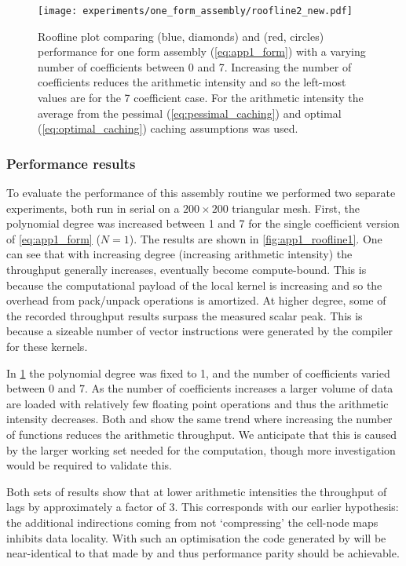 \documentclass[thesis]{subfiles}
\begin{document}
\begin{figure}
  \centering
  \texttt{[image: experiments/one\_form\_assembly/roofline2\_new.pdf]}
  \caption{
    Roofline plot comparing  (blue, diamonds) and  (red, circles) performance for one form assembly (\cref{eq:app1_form}) with a varying number of coefficients between 0 and 7.
    Increasing the number of coefficients reduces the arithmetic intensity and so the left-most values are for the 7 coefficient case.
    For the arithmetic intensity the average from the pessimal (\cref{eq:pessimal_caching}) and optimal (\cref{eq:optimal_caching}) caching assumptions was used.
  }
  \label{fig:app1_roofline2}
\end{figure}

\subsubsection{Performance results}

To evaluate the performance of this assembly routine we performed two separate experiments, both run in serial on a $200\times 200$ triangular mesh.
First, the polynomial degree was increased between 1 and 7 for the single coefficient version of \cref{eq:app1_form} ($N=1$).
The results are shown in \cref{fig:app1_roofline1}.
One can see that with increasing degree (increasing arithmetic intensity) the throughput generally increases, eventually become compute-bound.
This is because the computational payload of the local kernel is increasing and so the overhead from pack/unpack operations is amortized.
At higher degree, some of the recorded throughput results surpass the measured scalar peak.
This is because a sizeable number of vector instructions were generated by the compiler for these kernels.

In \cref{fig:app1_roofline2} the polynomial degree was fixed to 1, and the number of coefficients varied between 0 and 7.
As the number of coefficients increases a larger volume of data are loaded with relatively few floating point operations and thus the arithmetic intensity decreases.
Both  and  show the same trend where increasing the number of functions reduces the arithmetic throughput.
We anticipate that this is caused by the larger working set needed for the computation, though more investigation would be required to validate this.

Both sets of results show that at lower arithmetic intensities the throughput of  lags  by approximately a factor of 3.
This corresponds with our earlier hypothesis: the additional indirections coming from not `compressing' the cell-node maps inhibits data locality.
With such an optimisation the code generated by  will be near-identical to that made by  and thus performance parity should be achievable.
\end{document}
